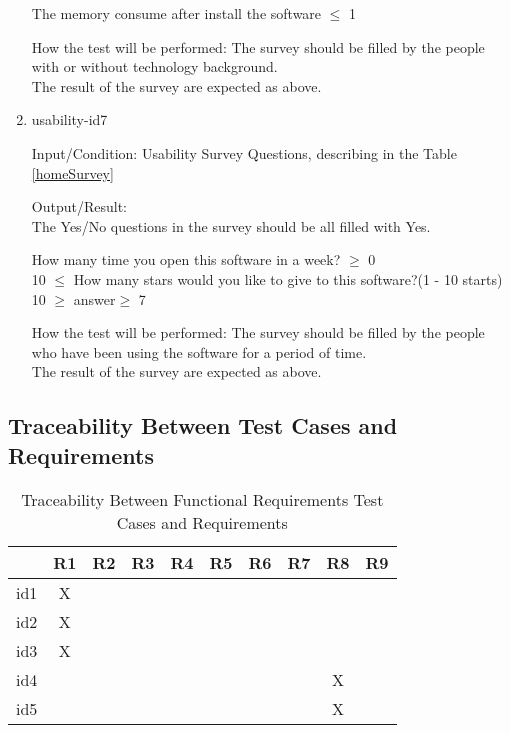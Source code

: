 \documentclass[12pt, titlepage]{article}
\begin{document}
\begin{enumerate}
The memory consume after install the software $\leq$ 1 %

How the test will be performed:
The survey should be filled by the people with or without technology background. \\
The result of the survey are expected as above.

\item{usability-id7\\}

Input/Condition: Usability Survey Questions, describing in the Table \ref{homeSurvey}

Output/Result: \\
The Yes/No questions in the survey should be all filled with Yes.

How many time you open this software in a week? $\geq$ 0\\

10 $\leq$ How many stars  would you like to give to this software?(1 - 10 starts) 10 $\geq$ answer$\geq$ 7

How the test will be performed:
The survey should be filled by the people who have been using the software for a period of time. \\
The result of the survey are expected as above.

\end{enumerate}




\newpage
\subsection{Traceability Between Test Cases and Requirements}


\begin{table}[h!]
\centering
\begin{tabular}{|c|c|c|c|c|c|c|c|c|c|}
\hline        
	& R1& R2 & R3 &R4 & R5 &R6  &R7 &R8 &R9 \\
\hline
id1        & X &    &     &    &    &    &   &    &    \\ \hline
id2        & X &    &     &    &    &    &   &    &     \\ \hline
id3        & X &    &     &    &    &    &   &    &    \\ \hline
id4        &     &    &     &     &    &    &   & X &      \\ \hline
id5        &    &    &     &     &    &    &   & X &     \\  \hline


\hline
\end{tabular}
\caption{Traceability Between Functional Requirements Test Cases and
Requirements}
\label{Table:Rtrace}
\end{table}
\end{document}
